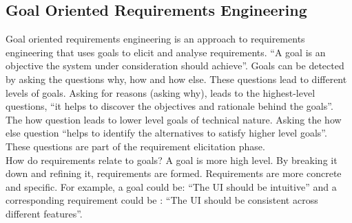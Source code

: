 \subsection{Goal Oriented Requirements Engineering}
Goal oriented requirements engineering is an approach to requirements engineering that uses goals to elicit and analyse requirements. “A goal is an objective the system under consideration should achieve”\cite{van2001goal:2}. Goals can be detected by asking the questions why, how and how else. These questions lead to different levels of goals. Asking for reasons (asking why), leads to the highest-level questions, “it helps to discover the objectives and rationale behind the goals”\cite{van2001goal:2}. The how question leads to lower level goals of technical nature. Asking the how else question “helps to identify the alternatives to satisfy higher level goals”\cite{van2001goal:2}. These questions are part of the requirement elicitation phase. \\
How do requirements relate to goals? A goal is more high level. By breaking it down and refining it, requirements are formed. Requirements are more concrete and specific. For example, a goal could be: “The UI should be intuitive” and a corresponding requirement could be : “The UI should be consistent across different features”.

